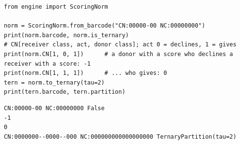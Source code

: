 \begin{lstlisting}[style=code]
from engine import ScoringNorm

norm = ScoringNorm.from_barcode("CN:00000-00 NC:00000000")
print(norm.barcode, norm.is_ternary)
# CN[receiver class, act, donor class]; act 0 = declines, 1 = gives
print(norm.CN[1, 0, 1])      # a donor with a score who declines a receiver with a score: -1
print(norm.CN[1, 1, 1])      # ... who gives: 0
tern = norm.to_ternary(tau=2)
print(tern.barcode, tern.partition)
\end{lstlisting}
\begin{lstlisting}[style=output]
CN:00000-00 NC:00000000 False
-1
0
CN:0000000--0000--000 NC:000000000000000000 TernaryPartition(tau=2)
\end{lstlisting}
